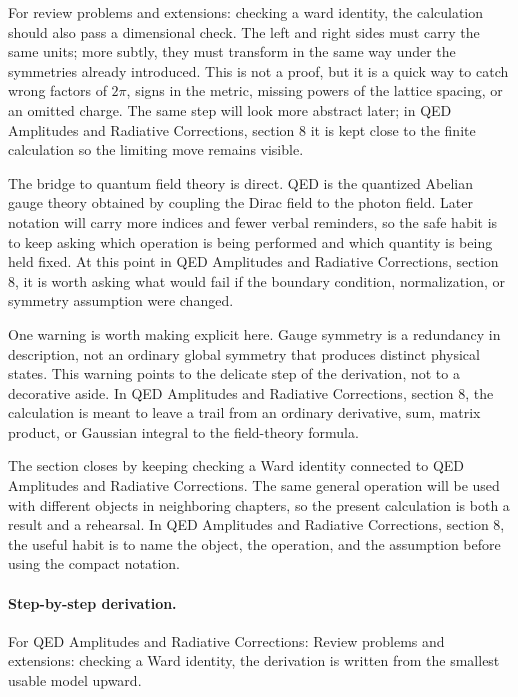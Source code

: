 For review problems and extensions: checking a ward identity, the calculation should also pass a dimensional check.  The left and right sides must carry the same units; more subtly, they must transform in the same way under the symmetries already introduced.  This is not a proof, but it is a quick way to catch wrong factors of \(2\pi\), signs in the metric, missing powers of the lattice spacing, or an omitted charge.  The same step will look more abstract later; in QED Amplitudes and Radiative Corrections, section 8 it is kept close to the finite calculation so the limiting move remains visible.

The bridge to quantum field theory is direct.  QED is the quantized Abelian gauge theory obtained by coupling the Dirac field to the photon field.  Later notation will carry more indices and fewer verbal reminders, so the safe habit is to keep asking which operation is being performed and which quantity is being held fixed.  At this point in QED Amplitudes and Radiative Corrections, section 8, it is worth asking what would fail if the boundary condition, normalization, or symmetry assumption were changed.

One warning is worth making explicit here.  Gauge symmetry is a redundancy in description, not an ordinary global symmetry that produces distinct physical states.  This warning points to the delicate step of the derivation, not to a decorative aside.  In QED Amplitudes and Radiative Corrections, section 8, the calculation is meant to leave a trail from an ordinary derivative, sum, matrix product, or Gaussian integral to the field-theory formula.

The section closes by keeping checking a Ward identity connected to QED Amplitudes and Radiative Corrections.  The same general operation will be used with different objects in neighboring chapters, so the present calculation is both a result and a rehearsal.  In QED Amplitudes and Radiative Corrections, section 8, the useful habit is to name the object, the operation, and the assumption before using the compact notation.



\paragraph{Step-by-step derivation.}

For QED Amplitudes and Radiative Corrections: Review problems and extensions: checking a Ward identity, the derivation is written from the smallest usable model upward.


